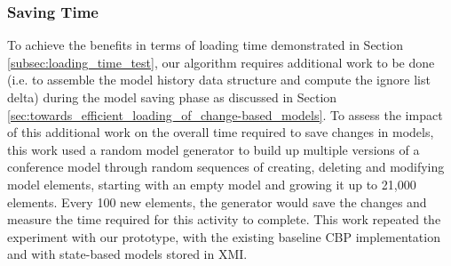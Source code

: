 \documentclass[12pt, a4paper]{report} \usepackage[titletoc]{appendix}
\begin{document}
\subsubsection{Saving Time}
\label{subsec:saving_time_test}

To achieve the benefits in terms of loading time demonstrated in Section \ref{subsec:loading_time_test}, our algorithm requires additional work to be done (i.e. to assemble the model history data structure and compute the ignore list delta) during the model saving phase as discussed in Section \ref{sec:towards_efficient_loading_of_change-based_models}. To assess the impact of this additional work on the overall time required to save changes in models, this work used a random model generator to build up multiple versions of a conference model through random sequences of creating, deleting and modifying model elements, starting with an empty model and growing it up to 21,000 elements. Every 100 new elements, the generator would save the changes and measure the time required for this activity to complete. This work repeated the experiment with our prototype, with the existing baseline CBP implementation and with state-based models stored in XMI.
\end{document}
